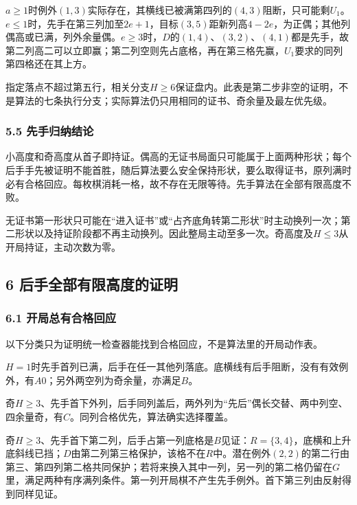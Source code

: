 \documentclass[
  a4paper,
]{article}
\begin{document}
\(a\ge 1\)时例外\((1,3)\)实际存在，其横线已被满第四列的\((4,3)\)阻断，只可能剩\(U_1\)。\(e\le 1\)时，先手在第三列加至\(2e+1\)，目标\((3,5)\)距新列高\(4-2e\)，为正偶；其他列偶高或已满，列外余量偶。\(e\ge 3\)时，\(D\)的\((1,4)\)、\((3,2)\)、\((4,1)\)都是先手，故第二列高二可以立即赢；第二列空则先占底格，再在第三格先赢，\(U_1\)要求的同列第四格还在其上方。

指定落点不超过第五行，相关分支\(H\ge 6\)保证盘内。此表是第二步非空的证明，不是算法的七条执行分支；实际算法仍只用相同的证书、奇余量及最左优先级。

\subsubsection{5.5
先手归纳结论}\label{ux5148ux624bux5f52ux7eb3ux7ed3ux8bba}

小高度和奇高度从首子即持证。偶高的无证书局面只可能属于上面两种形状；每个后手手先被证明不能首胜，随后算法要么安全保持形状，要么取得证书，原列满时必有合格回应。每枚棋消耗一格，故不存在无限等待。先手算法在全部有限高度不败。

无证书第一形状只可能在``进入证书''或``占齐底角转第二形状''时主动换列一次；第二形状以及持证阶段都不再主动换列。因此整局主动至多一次。奇高度及\(H\le 3\)从开局持证，主动次数为零。

\subsection{6
后手全部有限高度的证明}\label{ux540eux624bux5168ux90e8ux6709ux9650ux9ad8ux5ea6ux7684ux8bc1ux660e}

\subsubsection{6.1
开局总有合格回应}\label{ux5f00ux5c40ux603bux6709ux5408ux683cux56deux5e94}

以下分类只为证明统一检查器能找到合格回应，不是算法里的开局动作表。

\(H=1\)时先手首列已满，后手在任一其他列落底。底横线有后手阻断，没有有效例外，有\(A0\)；另外两空列为奇余量，亦满足\(B\)。

奇\(H\ge 3\)、先手首下外列，后手同列盖后，两外列为``先后''偶长交替、两中列空、四余量奇，有\(C\)。同列合格优先，算法确实选择覆盖。

奇\(H\ge 3\)、先手首下第二列，后手占第一列底格是\(B\)见证：\(R=\{3,4\}\)，底横和上升底斜线已挡；\(D\)由第二列第三格保护，该格不在\(R\)中。潜在例外\((2,2)\)的第二行由第三、第四列第二格共同保护；若将来换入其中一列，另一列的第二格仍留在\(G\)里，满足两种有序满列条件。第一列开局棋不产生先手例外。首下第三列由反射得到同样见证。
\end{document}
